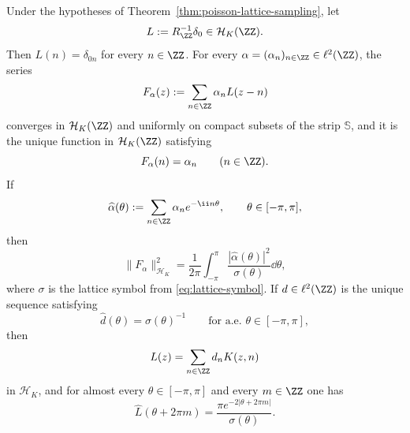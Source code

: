 \begin{theorem}%
\label{thm:poisson-cardinal-reconstruction}
Under the hypotheses of Theorem~\ref{thm:poisson-lattice-sampling}, let
\[
L:=R_{\ZZ}^{-1}\delta_0\in\mathcal H_K(\ZZ).
\]
Then $L(n)=\delta_{0n}$ for every $n\in\ZZ$.  For every
$\alpha=(\alpha_n)_{n\in\ZZ}\in\ell^2(\ZZ)$, the series
\[
F_\alpha(z):=\sum_{n\in\ZZ}\alpha_nL(z-n)
\]
converges in $\mathcal H_K(\ZZ)$ and uniformly on compact subsets of the
strip $\mathbb S$, and it is the unique function in $\mathcal H_K(\ZZ)$
satisfying
\[
F_\alpha(n)=\alpha_n
\qquad(n\in\ZZ).
\]
If
\[
\widehat\alpha(\theta):=\sum_{n\in\ZZ}\alpha_ne^{-\ii n\theta},
\qquad \theta\in[-\pi,\pi],
\]
then
\begin{equation}\label{eq:cardinal-norm-formula}
\|F_\alpha\|_{\mathcal H_K}^2
=\frac{1}{2\pi}\int_{-\pi}^{\pi}
\frac{|\widehat\alpha(\theta)|^2}{\sigma(\theta)}\dd\theta,
\end{equation}
where $\sigma$ is the lattice symbol from \eqref{eq:lattice-symbol}.  If
$d\in\ell^2(\ZZ)$ is the unique sequence satisfying
\[
\widehat d(\theta)=\sigma(\theta)^{-1}
\qquad\text{for a.e. }\theta\in[-\pi,\pi],
\]
then
\[
L(z)=\sum_{n\in\ZZ}d_nK(z,n)
\]
in $\mathcal H_K$, and for almost every $\theta\in[-\pi,\pi]$ and every
$m\in\ZZ$ one has
\begin{equation}\label{eq:cardinal-kernel-fourier}
\widehat L(\theta+2\pi m)
=\frac{\pi e^{-2|\theta+2\pi m|}}{\sigma(\theta)}.
\end{equation}
\end{theorem}


